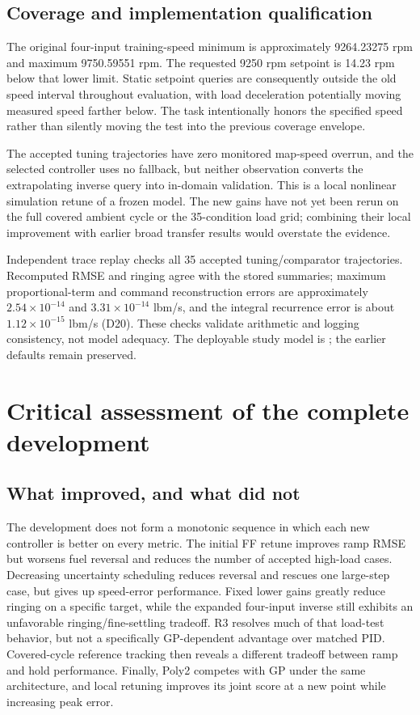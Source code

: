 \documentclass[11pt,a4paper,oneside]{report}
\begin{document}
\section{Coverage and implementation qualification}
The original four-input training-speed minimum is approximately 9264.23275 rpm and maximum 9750.59551 rpm. The requested 9250 rpm setpoint is 14.23 rpm below that lower limit. Static setpoint queries are consequently outside the old speed interval throughout evaluation, with load deceleration potentially moving measured speed farther below. The task intentionally honors the specified speed rather than silently moving the test into the previous coverage envelope.

The accepted tuning trajectories have zero monitored map-speed overrun, and the selected controller uses no fallback, but neither observation converts the extrapolating inverse query into in-domain validation. This is a local nonlinear simulation retune of a frozen model. The new gains have not yet been rerun on the full covered ambient cycle or the 35-condition load grid; combining their local improvement with earlier broad transfer results would overstate the evidence.

Independent trace replay checks all 35 accepted tuning/comparator trajectories. Recomputed RMSE and ringing agree with the stored summaries; maximum proportional-term and command reconstruction errors are approximately $2.54\times10^{-14}$ and $3.31\times10^{-14}$ lbm/s, and the integral recurrence error is about $1.12\times10^{-15}$ lbm/s (D20). These checks validate arithmetic and logging consistency, not model adequacy. The deployable study model is ; the earlier defaults remain preserved.

\chapter{Critical assessment of the complete development}
\section{What improved, and what did not}
The development does not form a monotonic sequence in which each new controller is better on every metric. The initial FF retune improves ramp RMSE but worsens fuel reversal and reduces the number of accepted high-load cases. Decreasing uncertainty scheduling reduces reversal and rescues one large-step case, but gives up speed-error performance. Fixed lower gains greatly reduce ringing on a specific target, while the expanded four-input inverse still exhibits an unfavorable ringing/fine-settling tradeoff. R3 resolves much of that load-test behavior, but not a specifically GP-dependent advantage over matched PID. Covered-cycle reference tracking then reveals a different tradeoff between ramp and hold performance. Finally, Poly2 competes with GP under the same architecture, and local retuning improves its joint score at a new point while increasing peak error.
\end{document}
